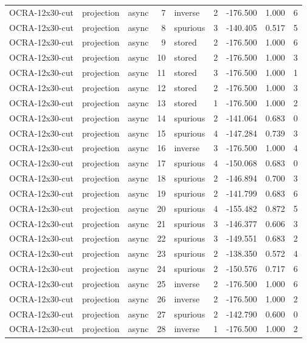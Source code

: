 \begin{tabular}{lllrlrrrr}
OCRA-12x30-cut & projection & async & 7 & inverse & 2 & -176.500 & 1.000 & 6 \\
OCRA-12x30-cut & projection & async & 8 & spurious & 3 & -140.405 & 0.517 & 5 \\
OCRA-12x30-cut & projection & async & 9 & stored & 2 & -176.500 & 1.000 & 6 \\
OCRA-12x30-cut & projection & async & 10 & stored & 2 & -176.500 & 1.000 & 3 \\
OCRA-12x30-cut & projection & async & 11 & stored & 3 & -176.500 & 1.000 & 1 \\
OCRA-12x30-cut & projection & async & 12 & stored & 2 & -176.500 & 1.000 & 3 \\
OCRA-12x30-cut & projection & async & 13 & stored & 1 & -176.500 & 1.000 & 2 \\
OCRA-12x30-cut & projection & async & 14 & spurious & 2 & -141.064 & 0.683 & 0 \\
OCRA-12x30-cut & projection & async & 15 & spurious & 4 & -147.284 & 0.739 & 3 \\
OCRA-12x30-cut & projection & async & 16 & inverse & 3 & -176.500 & 1.000 & 4 \\
OCRA-12x30-cut & projection & async & 17 & spurious & 4 & -150.068 & 0.683 & 0 \\
OCRA-12x30-cut & projection & async & 18 & spurious & 2 & -146.894 & 0.700 & 3 \\
OCRA-12x30-cut & projection & async & 19 & spurious & 2 & -141.799 & 0.683 & 6 \\
OCRA-12x30-cut & projection & async & 20 & spurious & 4 & -155.482 & 0.872 & 5 \\
OCRA-12x30-cut & projection & async & 21 & spurious & 3 & -146.377 & 0.606 & 3 \\
OCRA-12x30-cut & projection & async & 22 & spurious & 3 & -149.551 & 0.683 & 2 \\
OCRA-12x30-cut & projection & async & 23 & spurious & 2 & -138.350 & 0.572 & 4 \\
OCRA-12x30-cut & projection & async & 24 & spurious & 2 & -150.576 & 0.717 & 6 \\
OCRA-12x30-cut & projection & async & 25 & inverse & 2 & -176.500 & 1.000 & 6 \\
OCRA-12x30-cut & projection & async & 26 & inverse & 2 & -176.500 & 1.000 & 2 \\
OCRA-12x30-cut & projection & async & 27 & spurious & 2 & -142.790 & 0.600 & 0 \\
OCRA-12x30-cut & projection & async & 28 & inverse & 1 & -176.500 & 1.000 & 2 \\

\end{tabular}
